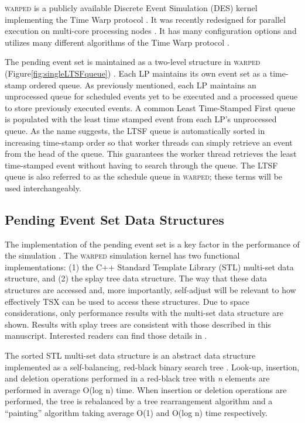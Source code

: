 \documentclass{sig-alternate}
\begin{document}
\textsc{warped} is a publicly available Discrete Event Simulation (DES) kernel
implementing the Time Warp protocol \cite{martin,fujimoto}.  It was recently redesigned
for parallel execution on multi-core processing nodes \cite{muthalagu}.  It has many
configuration options and utilizes many different algorithms of the Time Warp protocol
\cite{fujimoto}.

The pending event set is maintained as a two-level structure in \textsc{warped}
(Figure\ref{fig:singleLTSFqueue}) \cite{dickman}.  Each LP maintains its own event set as
a time-stamp ordered queue.  As previously mentioned, each LP maintains an unprocessed
queue for scheduled events yet to be executed and a processed queue to store previously
executed events.  A common Least Time-Stamped First queue is populated with the least time
stamped event from each LP's unprocessed queue.  As the name suggests, the LTSF queue is
automatically sorted in increasing time-stamp order so that worker threads can simply
retrieve an event from the head of the queue.  This guarantees the worker thread retrieves
the least time-stamped event without having to search through the queue. The LTSF queue is
also referred to as the schedule queue in \textsc{warped}; these terms will be used
interchangeably.  

\subsection{Pending Event Set Data Structures}

The implementation of the pending event set is a key factor in the performance of the
simulation \cite{twpes}.  The \textsc{warped} simulation kernel has two functional
implementations: (1) the C++ Standard Template Library (STL) multi-set data structure, and
(2) the splay tree data structure.  The way that these data structures are accessed and,
more importantly, self-adjust will be relevant to how effectively TSX can be used to
access these structures.  Due to space considerations, only performance results with the
multi-set data structure are shown.  Results with splay trees are consistent with those
described in this manuscript.  Interested readers can find those details in \cite{hay-14}.

The sorted STL multi-set data structure is an abstract data structure implemented as a
self-balancing, red-black binary search tree \cite{redblack}.  Look-up, insertion, and
deletion operations performed in a red-black tree with \emph{n} elements are performed in
average O(log n) time.  When insertion or deletion operations are performed, the tree is
rebalanced by a tree rearrangement algorithm and a ``painting'' algorithm taking average
O(1) and O(log n) time respectively.
\end{document}
